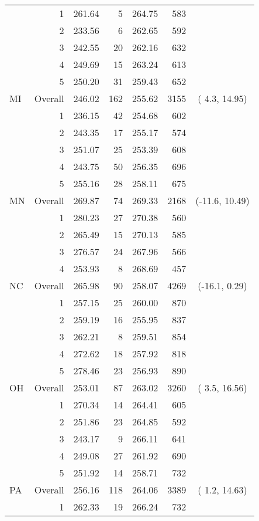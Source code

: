 \begin{longtable}{lrrr@{\extracolsep{.25cm}}rrc}
   & 1 & 261.64 &   5 & 264.75 & 583 &  \\ 
   & 2 & 233.56 &   6 & 262.65 & 592 &  \\ 
   & 3 & 242.55 &  20 & 262.16 & 632 &  \\ 
   & 4 & 249.69 &  15 & 263.24 & 613 &  \\ 
   & 5 & 250.20 &  31 & 259.43 & 652 &  \\ 
   \hline
MI & Overall & 246.02 & 162 & 255.62 & 3155 & (  4.3,  14.95) \\ 
   & 1 & 236.15 &  42 & 254.68 & 602 &  \\ 
   & 2 & 243.35 &  17 & 255.17 & 574 &  \\ 
   & 3 & 251.07 &  25 & 253.39 & 608 &  \\ 
   & 4 & 243.75 &  50 & 256.35 & 696 &  \\ 
   & 5 & 255.16 &  28 & 258.11 & 675 &  \\ 
   \hline
MN & Overall & 269.87 &  74 & 269.33 & 2168 & (-11.6,  10.49) \\ 
   & 1 & 280.23 &  27 & 270.38 & 560 &  \\ 
   & 2 & 265.49 &  15 & 270.13 & 585 &  \\ 
   & 3 & 276.57 &  24 & 267.96 & 566 &  \\ 
   & 4 & 253.93 &   8 & 268.69 & 457 &  \\ 
   \hline
NC & Overall & 265.98 &  90 & 258.07 & 4269 & (-16.1,   0.29) \\ 
   & 1 & 257.15 &  25 & 260.00 & 870 &  \\ 
   & 2 & 259.19 &  16 & 255.95 & 837 &  \\ 
   & 3 & 262.21 &   8 & 259.51 & 854 &  \\ 
   & 4 & 272.62 &  18 & 257.92 & 818 &  \\ 
   & 5 & 278.46 &  23 & 256.93 & 890 &  \\ 
   \hline
OH & Overall & 253.01 &  87 & 263.02 & 3260 & (  3.5,  16.56) \\ 
   & 1 & 270.34 &  14 & 264.41 & 605 &  \\ 
   & 2 & 251.86 &  23 & 264.85 & 592 &  \\ 
   & 3 & 243.17 &   9 & 266.11 & 641 &  \\ 
   & 4 & 249.08 &  27 & 261.92 & 690 &  \\ 
   & 5 & 251.92 &  14 & 258.71 & 732 &  \\ 
   \hline
PA & Overall & 256.16 & 118 & 264.06 & 3389 & (  1.2,  14.63) \\ 
   & 1 & 262.33 &  19 & 266.24 & 732 &  \\ 

\end{longtable}

